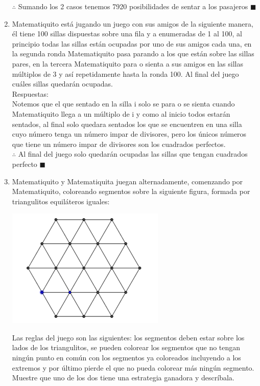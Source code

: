\documentclass{book}
\begin{document}
\begin{enumerate}
        $\therefore$ Sumando los 2 casos tenemos 7920 posibilidades de sentar a los pasajeros $\blacksquare$\\
        \item Matematiquito está jugando un juego con sus amigos de la siguiente manera, él tiene 100 sillas dispuestas sobre una fila y a enumeradas de 1 al 100, al principio todas las sillas están ocupadas por uno de sus amigos cada una, en la segunda ronda Matematiquito pasa parando a los que están sobre las sillas pares, en la tercera Matematiquito para o sienta a sus amigos en las sillas múltiplos de 3 y así repetidamente hasta la ronda 100. Al final del juego cuáles sillas quedarán ocupadas.\\
        Respuestas:\\
        Notemos que el que sentado en la silla i solo se para o se sienta cuando Matematiquito llega a un múltiplo de i y como al inicio todos estarán sentados, al final solo quedara sentados los que se encuentren en una silla cuyo número tenga un número impar de divisores, pero los únicos números que tiene un número impar de divisores son los cuadrados perfectos.\\
        $\therefore$ Al final del juego solo quedarán ocupadas las sillas que tengan cuadrados perfecto $\blacksquare$\\
        \item Matematiquito y Matematiquita juegan alternadamente, comenzando por Matematiquito, coloreando segmentos sobre la siguiente figura, formada por triangulitos equiláteros iguales:
        \begin{center}
            \includegraphics[scale=1]{imagenes/Combinatoria/11.png}
        \end{center}
        Las reglas del juego son las siguientes: los segmentos deben estar sobre los lados de los triangulitos, se pueden colorear los segmentos que no tengan ningún punto en común con los segmentos ya coloreados incluyendo a los extremos y por último pierde el que no pueda colorear más ningún segmento. Muestre que uno de los dos tiene una estrategia ganadora y descríbala.\\

\end{enumerate}
\end{document}
